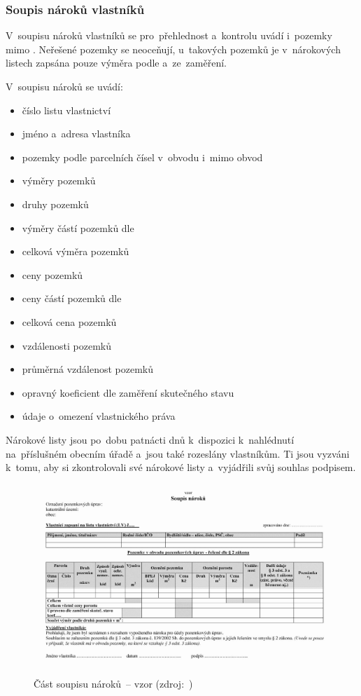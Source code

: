 \subsubsection{Soupis nároků vlastníků}
\label{soupis_naroku_vlastniku}

V~soupisu nároků vlastníků se pro~přehlednost a~kontrolu uvádí
i~pozemky mimo . Neřešené pozemky se neoceňují, u~takových
pozemků je v~nárokových listech zapsána pouze výměra podle 
a~ze~zaměření.

V~soupisu nároků se uvádí: \vspace{-\topsep}
	\begin{itemize}[leftmargin=1.5cm, noitemsep]
		\item číslo listu vlastnictví
		\item jméno a~adresa vlastníka
		\item pozemky podle parcelních čísel v~obvodu i~mimo
obvod 
		\item výměry pozemků
		\item druhy pozemků
		\item výměry částí pozemků dle 
		\item celková výměra pozemků
		\item ceny pozemků
		\item ceny částí pozemků dle 
		\item celková cena pozemků
		\item vzdálenosti pozemků
		\item průměrná vzdálenost pozemků
		\item opravný koeficient dle zaměření skutečného stavu
		\item údaje o~omezení vlastnického práva
	\end{itemize}

Nárokové listy jsou po~dobu patnácti dnů k~dispozici k~nahlédnutí
na~příslušném obecním úřadě a~jsou také rozeslány vlastníkům. Ti jsou
vyzváni k~tomu, aby si zkontrolovali své nárokové listy a~vyjádřili
svůj souhlas podpisem.
 	
	\begin{figure}[H] \centering
		\includegraphics[width=.9\textwidth]{./pictures/soupis_naroku.png}
		\caption[Část soupisu nároků~– vzor]{Část soupisu nároků~– vzor
(zdroj:~\citep{vyhlaska_13})}
		\label{fig:soupis_naroku}
 	\end{figure}

